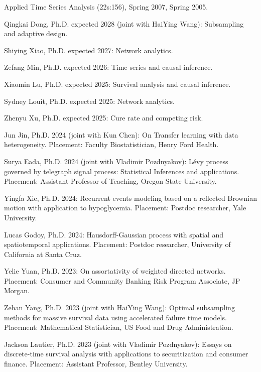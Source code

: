 \documentclass[Statistics]{vita}
\begin{document}
\begin{vita}
\begin{TeachingExperience}
\begin{UIowa}
    \item Applied Time Series Analysis (22s:156), Spring 2007, Spring 2005.
    \end{UIowa}
  \end{TeachingExperience}
  \begin{Students}
    \begin{Ph.D.}
    \item Qingkai Dong, Ph.D. expected 2028 (joint with HaiYing Wang): Subsampling and adaptive design.
    \item Shiying Xiao, Ph.D. expected 2027: Network analytics.
    \item Zefang Min, Ph.D. expected 2026: Time series and causal inference.
    \item Xiaomin Lu, Ph.D. expected 2025: Survival analysis and causal inference.
    \item Sydney Louit, Ph.D. expected 2025: Network analytics.
    \item Zhenyu Xu, Ph.D. expected 2025: Cure rate and competing risk.
    \item Jun Jin, Ph.D. 2024 (joint with Kun Chen): On Transfer learning with data heterogeneity. Placement: Faculty Biostatistician, Henry Ford Health.
    \item Surya Eada, Ph.D. 2024 (joint with Vladimir Pozdnyakov): L\'evy process governed by telegraph signal process: Statistical Inferences and applications. Placement: Assistant Professor of Teaching, Oregon State University.
    \item Yingfa Xie, Ph.D. 2024: Recurrent events modeling based on a reflected Brownian motion with application to hypoglycemia. Placement: Postdoc researcher, Yale University.
    \item Lucas Godoy, Ph.D. 2024: Hausdorff-Gaussian process with spatial and spatiotemporal applications. Placement: Postdoc researcher, University of California at Santa Cruz.
    \item Yelie Yuan, Ph.D. 2023: On assortativity of weighted directed networks. Placement: Consumer and Community Banking Risk Program Associate,  JP Morgan.
    \item Zehan Yang, Ph.D. 2023 (joint with HaiYing Wang): Optimal subsampling methods for massive survival data using accelerated failure time models. Placement: Mathematical Statistician, US Food and Drug Administration.
    \item Jackson Lautier, Ph.D. 2023 (joint with Vladimir Pozdnyakov): Essays on discrete-time survival analysis with applications to securitization and consumer finance. Placement: Assistant Professor, Bentley University. 

\end{Ph.D.}
\end{Students}
\end{vita}
\end{document}
